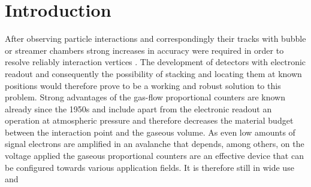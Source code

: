 \section{Introduction}  \label{sec:Introduction}
After observing particle interactions and correspondingly their tracks with
bubble or streamer chambers strong increases in accuracy were required in order
to resolve reliably interaction vertices \cite{charpak_high-resolution_1984}.
The development of detectors with electronic readout and consequently the
possibility of stacking and locating them at known positions would therefore
prove to be a working and robust solution to this problem. Strong advantages of
the gas-flow proportional counters are known already since the 1950s \cite{hendee_gasflow_1956} and include
apart from the electronic readout an operation at atmospheric pressure and
therefore decreases the material budget between the interaction point and the
gaseous volume. As even low amounts of signal electrons are amplified in an
avalanche that depends, among others, on the voltage applied the gaseous
proportional counters are an effective device that can be configured towards
various application fields. It is therefore still in wide use
\cite{Mindur:2017nqn} and
